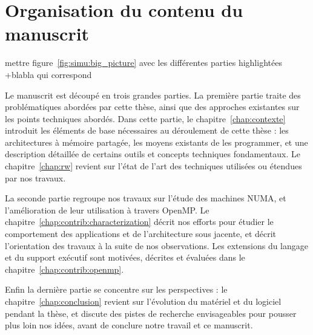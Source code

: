 \section{Organisation du contenu du manuscrit}\label{sec:intro:outline}

\begin{todo}

  mettre figure~\ref{fig:simu:big_picture} avec les différentes parties highlightées
  +blabla qui correspond
\end{todo}

Le manuscrit est découpé en trois grandes parties.
La première partie traite des problématiques abordées par cette thèse, ainsi que des approches existantes sur les points techniques abordés.
Dans cette partie, le chapitre~\ref{chap:contexte} introduit les éléments de base nécessaires au déroulement de cette thèse : les architectures à mémoire partagée, les moyens existants de les programmer, et une description détaillée de certains outils et concepts techniques fondamentaux.
Le chapitre~\ref{chap:rw} revient sur l'état de l'art des techniques utilisées ou étendues par nos travaux.

La seconde partie regroupe nos travaux sur l'étude des machines NUMA, et l'amélioration de leur utilisation à travers OpenMP.
Le chapitre~\ref{chap:contrib:characterization} décrit nos efforts pour étudier le comportement des applications et de l'architecture sous jacente, et décrit l'orientation des travaux à la suite de nos observations.
Les extensions du langage et du support exécutif sont motivées, décrites et évaluées dans le chapitre~\ref{chap:contrib:openmp}.

Enfin la dernière partie se concentre sur les perspectives : le chapitre~\ref{chap:conclusion} revient sur l'évolution du matériel et du logiciel pendant la thèse, et discute des pistes de recherche envisageables pour pousser plus loin nos idées, avant de conclure notre travail et ce manuscrit.
